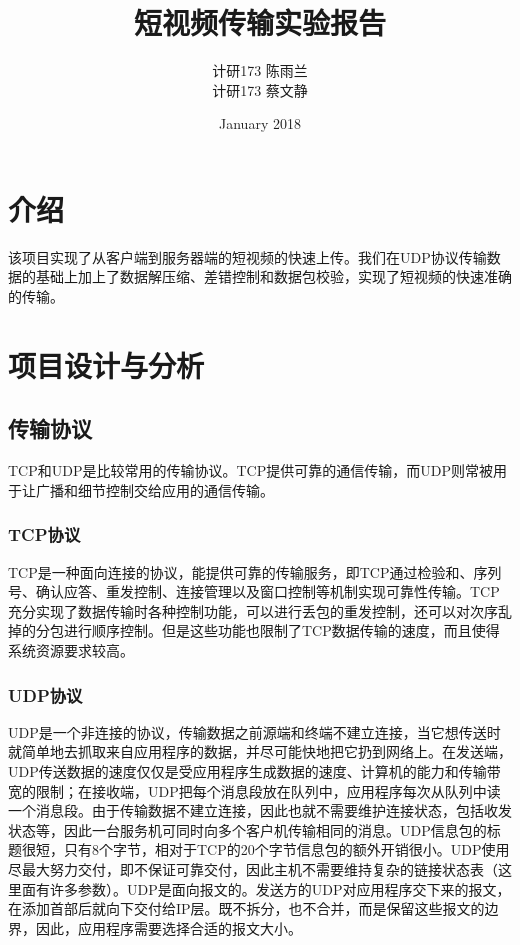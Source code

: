 \documentclass{article}
\title{短视频传输实验报告}
\author{计研173 \quad 陈雨兰 \quad 2017310787  \\ 计研173 \quad 蔡文静 \quad 2017210866}
\date{January 2018}
\begin{document}
\begin{CJK*}{UTF8}{gbsn}

\maketitle
\section{介绍}
该项目实现了从客户端到服务器端的短视频的快速上传。我们在UDP协议传输数据的基础上加上了数据解压缩、差错控制和数据包校验，实现了短视频的快速准确的传输。

\section{项目设计与分析}
\subsection{传输协议}
TCP和UDP是比较常用的传输协议。TCP提供可靠的通信传输，而UDP则常被用于让广播和细节控制交给应用的通信传输。
\subsubsection{TCP协议}
TCP是一种面向连接的协议，能提供可靠的传输服务，即TCP通过检验和、序列号、确认应答、重发控制、连接管理以及窗口控制等机制实现可靠性传输。TCP充分实现了数据传输时各种控制功能，可以进行丢包的重发控制，还可以对次序乱掉的分包进行顺序控制。但是这些功能也限制了TCP数据传输的速度，而且使得系统资源要求较高。
\subsubsection{UDP协议}

UDP是一个非连接的协议，传输数据之前源端和终端不建立连接，当它想传送时就简单地去抓取来自应用程序的数据，并尽可能快地把它扔到网络上。在发送端，UDP传送数据的速度仅仅是受应用程序生成数据的速度、计算机的能力和传输带宽的限制；在接收端，UDP把每个消息段放在队列中，应用程序每次从队列中读一个消息段。由于传输数据不建立连接，因此也就不需要维护连接状态，包括收发状态等，因此一台服务机可同时向多个客户机传输相同的消息。UDP信息包的标题很短，只有8个字节，相对于TCP的20个字节信息包的额外开销很小。UDP使用尽最大努力交付，即不保证可靠交付，因此主机不需要维持复杂的链接状态表（这里面有许多参数）。UDP是面向报文的。发送方的UDP对应用程序交下来的报文，在添加首部后就向下交付给IP层。既不拆分，也不合并，而是保留这些报文的边界，因此，应用程序需要选择合适的报文大小。


\end{CJK*}
\end{document}
